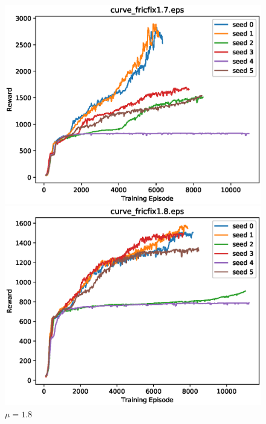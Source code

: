 \begin{figure}[p]
 \begin{minipage}{0.49\hsize}
  \begin{center}
 \includegraphics[width=.99\linewidth]{./fig/curve_fricfix1.7.eps}
  \caption{$\mu=1.7$
  }
  \end{center}
 \end{minipage}
 \begin{minipage}{0.49\hsize}
   \begin{center}
 \includegraphics[width=.99\linewidth]{./fig/curve_fricfix1.8.eps}
  \caption{$\mu=1.8$
     }
  \end{center}
 \end{minipage}
\end{figure}

